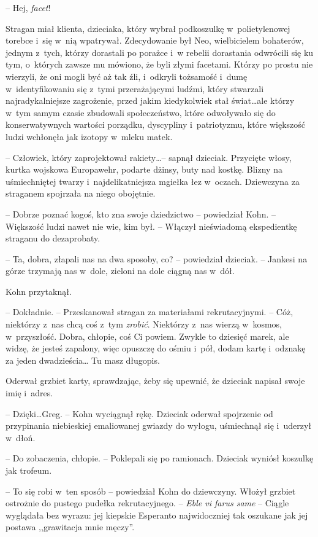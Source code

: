 \documentclass[oneside,polish,11pt,sfheadings]{mwbk}
\let\footnote=\endnote
\begin{document}
-- Hej, \emph{facet}!

Stragan miał klienta, dzieciaka, który wybrał podkoszulkę w~polietylenowej torebce i~się w~nią wpatrywał. Zdecydowanie był Neo,
wielbicielem bohaterów, jednym z~tych, którzy dorastali po porażce i~w rebelii dorastania odwrócili się ku tym, o~których zawsze mu mówiono, że
byli złymi facetami. Którzy po prostu nie wierzyli, że oni mogli być aż
tak źli, i~odkryli tożsamość i~dumę w~identyfikowaniu się z~tymi
przerażającymi ludźmi, który stwarzali najradykalniejsze zagrożenie,
przed jakim kiedykolwiek stał świat\ldots ale którzy w~tym samym czasie
zbudowali społeczeństwo, które odwoływało się do konserwatywnych
wartości porządku, dyscypliny i~patriotyzmu, które większość ludzi
wchłonęła jak izotopy w~mleku matek.

-- Człowiek, który zaprojektował rakiety\ldots -- sapnął dzieciak. Przycięte
włosy, kurtka wojskowa Europawehr, podarte dżinsy, buty nad kostkę.
Blizny na uśmiechniętej twarzy i~najdelikatniejsza mgiełka łez w~oczach.
Dziewczyna za straganem spojrzała na niego obojętnie.

-- Dobrze poznać kogoś, kto zna swoje dziedzictwo -- powiedział Kohn. -- Większość ludzi nawet nie wie, kim był. -- Włączył nieświadomą
ekspedientkę straganu do dezaprobaty.

-- Ta, dobra, złapali nas na dwa sposoby, co? -- powiedział dzieciak. -- Jankesi na górze trzymają nas w~dole, zieloni na dole ciągną nas w~dół.

Kohn przytaknął. 

-- Dokładnie. -- Przeskanował stragan za materiałami
rekrutacyjnymi. -- Cóż, niektórzy z~nas chcą coś z~tym \emph{zrobić}.
Niektórzy z~nas wierzą w~kosmos, w~przyszłość. Dobra, chłopie, coś Ci
powiem. Zwykle to dziesięć marek, ale widzę, że jesteś zapalony, więc
opuszczę do ośmiu i~pół, dodam kartę i~odznakę za jeden dwadzieścia\ldots
Tu masz długopis.

Oderwał grzbiet karty, sprawdzając, żeby się upewnić, że dzieciak
napisał swoje imię i~adres.

-- Dzięki\ldots Greg. -- Kohn wyciągnął rękę. Dzieciak oderwał spojrzenie od
przypinania niebieskiej emaliowanej gwiazdy do wyłogu, uśmiechnął się i~uderzył w~dłoń.

-- Do zobaczenia, chłopie. -- Poklepali się po ramionach. Dzieciak wyniósł
koszulkę jak trofeum.

-- To się robi w~ten sposób -- powiedział Kohn do dziewczyny. Włożył
grzbiet ostrożnie do pustego pudełka rekrutacyjnego. -- \emph{Eble vi
farus same}\footnote{esperanto, ,,Może zrobiłabyś to samo'' -- przyp.tłum} -- Ciągle wyglądała bez wyrazu: jej kiepskie Esperanto najwidoczniej tak
oszukane jak jej postawa ,,grawitacja mnie męczy''.
\end{document}
